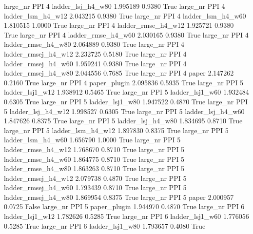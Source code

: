   large_nr      PPI                 4   ladder_lsj_h4_w80   1.995189      0.9380    True
  large_nr      PPI                 4   ladder_lsm_h4_w12   2.043215      0.9380    True
  large_nr      PPI                 4   ladder_lsm_h4_w60   1.810515      1.0000    True
  large_nr      PPI                 4  ladder_rmse_h4_w12   1.925721      0.9380    True
  large_nr      PPI                 4  ladder_rmse_h4_w60   2.030165      0.9380    True
  large_nr      PPI                 4  ladder_rmse_h4_w80   2.064889      0.9380    True
  large_nr      PPI                 4 ladder_rmsej_h4_w12   2.232725      0.5180    True
  large_nr      PPI                 4 ladder_rmsej_h4_w60   1.959241      0.9380    True
  large_nr      PPI                 4 ladder_rmsej_h4_w80   2.044556      0.7685    True
  large_nr      PPI                 4               paper   2.147262      0.2160    True
  large_nr      PPI                 4        paper_plugin   2.095836      0.5935    True
  large_nr      PPI                 5     ladder_lsj1_w12   1.938912      0.5465    True
  large_nr      PPI                 5     ladder_lsj1_w60   1.932484      0.6305    True
  large_nr      PPI                 5     ladder_lsj1_w80   1.947522      0.4870    True
  large_nr      PPI                 5   ladder_lsj_h4_w12   1.998527      0.6305    True
  large_nr      PPI                 5   ladder_lsj_h4_w60   1.847626      0.8375    True
  large_nr      PPI                 5   ladder_lsj_h4_w80   1.834695      0.8710    True
  large_nr      PPI                 5   ladder_lsm_h4_w12   1.897830      0.8375    True
  large_nr      PPI                 5   ladder_lsm_h4_w60   1.656790      1.0000    True
  large_nr      PPI                 5  ladder_rmse_h4_w12   1.768670      0.8710    True
  large_nr      PPI                 5  ladder_rmse_h4_w60   1.864775      0.8710    True
  large_nr      PPI                 5  ladder_rmse_h4_w80   1.863263      0.8710    True
  large_nr      PPI                 5 ladder_rmsej_h4_w12   2.079738      0.4870    True
  large_nr      PPI                 5 ladder_rmsej_h4_w60   1.793439      0.8710    True
  large_nr      PPI                 5 ladder_rmsej_h4_w80   1.869954      0.8375    True
  large_nr      PPI                 5               paper   2.000957      0.0725   False
  large_nr      PPI                 5        paper_plugin   1.944970      0.4870    True
  large_nr      PPI                 6     ladder_lsj1_w12   1.782626      0.5285    True
  large_nr      PPI                 6     ladder_lsj1_w60   1.776056      0.5285    True
  large_nr      PPI                 6     ladder_lsj1_w80   1.793657      0.4080    True
